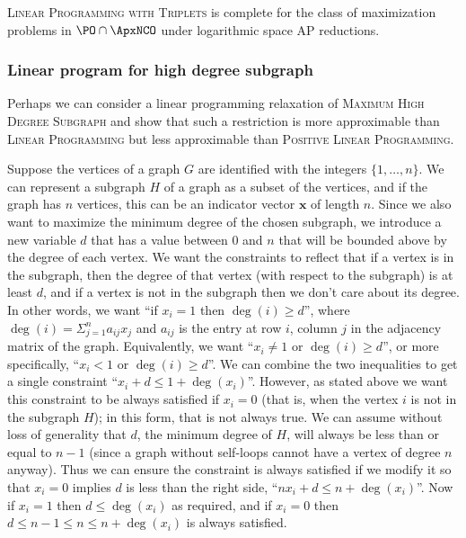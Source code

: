 \documentclass[]{article}
\begin{document}
\begin{conjecture}
  \textsc{Linear Programming with Triplets} is complete for the class of maximization problems in $\PO \cap \ApxNCO$ under logarithmic space AP reductions.
\end{conjecture}

\subsubsection{Linear program for high degree subgraph}

Perhaps we can consider a linear programming relaxation of \textsc{Maximum High Degree Subgraph} and show that such a restriction is more approximable than \textsc{Linear Programming} but less approximable than \textsc{Positive Linear Programming}.

Suppose the vertices of a graph $G$ are identified with the integers $\{1, \dotsc, n\}$.
We can represent a subgraph $H$ of a graph as a subset of the vertices, and if the graph has $n$ vertices, this can be an indicator vector $\mathbf{x}$ of length $n$.
Since we also want to maximize the minimum degree of the chosen subgraph, we introduce a new variable $d$ that has a value between $0$ and $n$ that will be bounded above by the degree of each vertex.
We want the constraints to reflect that if a vertex is in the subgraph, then the degree of that vertex (with respect to the subgraph) is at least $d$, and if a vertex is not in the subgraph then we don't care about its degree.
In other words, we want ``if $x_i = 1$ then $\deg(i) \geq d$'', where $\deg(i) = \Sigma_{j = 1}^n a_{ij} x_j$ and $a_{ij}$ is the entry at row $i$, column $j$ in the adjacency matrix of the graph.
Equivalently, we want ``$x_i \neq 1$ or $\deg(i) \geq d$'', or more specifically, ``$x_i < 1$ or $\deg(i) \geq d$''.
We can combine the two inequalities to get a single constraint ``$x_i + d \leq 1 + \deg(x_i)$''.
However, as stated above we want this constraint to be always satisfied if $x_i = 0$ (that is, when the vertex $i$ is not in the subgraph $H$); in this form, that is not always true.
We can assume without loss of generality that $d$, the minimum degree of $H$, will always be less than or equal to $n - 1$ (since a graph without self-loops cannot have a vertex of degree $n$ anyway).
Thus we can ensure the constraint is always satisfied if we modify it so that $x_i = 0$ implies $d$ is less than the right side, ``$n x_i + d \leq n + \deg(x_i)$''.
Now if $x_i = 1$ then $d \leq \deg(x_i)$ as required, and if $x_i = 0$ then $d \leq n- 1 \leq n \leq n + \deg(x_i)$ is always satisfied.
\end{document}
